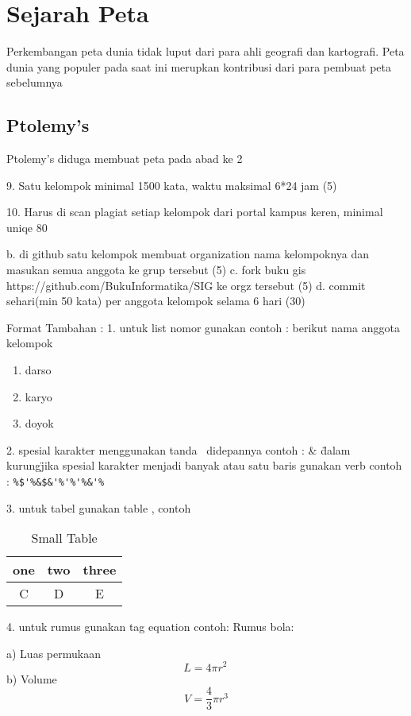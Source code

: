 			\section{Sejarah Peta}
			Perkembangan peta dunia tidak luput dari para ahli geografi dan kartografi. Peta dunia yang populer pada saat ini merupkan kontribusi dari para 
			pembuat peta sebelumnya

			\subsection{Ptolemy's}
			Ptolemy's diduga membuat peta pada abad ke 2
	
		9. Satu kelompok minimal 1500 kata, waktu maksimal 6*24 jam (5)

		10. Harus di scan plagiat setiap kelompok dari portal kampus keren, minimal uniqe 80%






b. di github satu kelompok membuat organization nama kelompoknya dan masukan semua anggota ke grup tersebut (5)
c. fork buku gis https://github.com/BukuInformatika/SIG ke orgz tersebut (5)
d. commit sehari(min 50 kata) per anggota kelompok selama 6 hari (30)




Format Tambahan :
1. untuk list nomor gunakan
	contoh :
	berikut nama anggota kelompok
\begin{enumerate}
	\item darso
	\item karyo
	\item doyok
\end{enumerate}

2. spesial karakter menggunakan tanda \ didepannya
	contoh :
	\&
	\"dalam kurung\"
	jika spesial karakter menjadi banyak atau satu baris gunakan verb
	contoh :
	\verb|%$'%&$&'%'%'%&'%|
	
3. untuk tabel gunakan table , contoh

\begin{table}[h]
\caption{Small Table}
\centering
\begin{tabular}{ccc}
\hline
one&two&three\\
\hline
C&D&E\\
\hline
\end{tabular}
\end{table}

4. untuk rumus gunakan tag equation
	contoh:
	Rumus bola:

	a) Luas permukaan
	 \begin{equation}
	     L = 4 \pi r^2 \,
	\end{equation}
	b) Volume
	 \begin{equation}
	     V = \frac{4}{3}\pi r^3
	\end{equation}